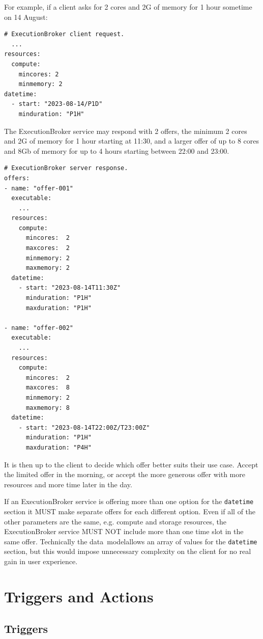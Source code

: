 \documentclass[11pt,a4paper]{ivoa}
\newcommand{\datamodel} {data~model}
\newcommand{\execbrokerclass} {ExecutionBroker}
\newcommand{\codeword}[1] {\texttt{#1}}
\begin{document}
For example, if a client asks for 2 cores and 2G of memory for 1 hour sometime on 14 August:
\begin{lstlisting}[]
# ExecutionBroker client request.
  ...
resources:
  compute:
    mincores: 2
    minmemory: 2
datetime:
  - start: "2023-08-14/P1D"
    minduration: "P1H"
\end{lstlisting}

The  \execbrokerclass{} service may respond with 2 offers,
the minimum 2 cores and 2G of memory for 1 hour starting at 11:30,
and a larger offer of up to 8 cores and 8Gb of memory for up to 4 hours
starting between 22:00 and 23:00.

\begin{lstlisting}[]
# ExecutionBroker server response.
offers:
- name: "offer-001"
  executable:
    ...
  resources:
    compute:
      mincores:  2
      maxcores:  2
      minmemory: 2
      maxmemory: 2
  datetime:
    - start: "2023-08-14T11:30Z"
      minduration: "P1H"
      maxduration: "P1H"

- name: "offer-002"
  executable:
    ...
  resources:
    compute:
      mincores:  2
      maxcores:  8
      minmemory: 2
      maxmemory: 8
  datetime:
    - start: "2023-08-14T22:00Z/T23:00Z"
      minduration: "P1H"
      maxduration: "P4H"
\end{lstlisting}

It is then up to the client to decide which offer better suits their use case.
Accept the limited offer in the morning, or accept the more generous offer with
more resources and more time later in the day.

If an \execbrokerclass{} service is offering more than one option for the \codeword{datetime}
section it MUST make separate offers for each different option.
Even if all of the other parameters are the same, e.g. compute and storage resources, the
\execbrokerclass{} service MUST NOT include more than one time slot in the same offer.
Technically the \datamodel allows an array of values for the \codeword{datetime} section,
but this would impose unnecessary complexity on the client for no real gain in user experience.

\section{Triggers and Actions}
\label{triggers-actions}

\subsection{Triggers}
\label{triggers}
\end{document}
